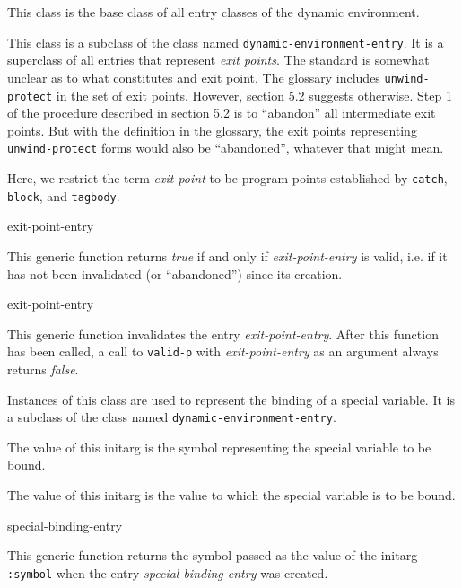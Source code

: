 
This class is the base class of all entry classes of the dynamic
environment.


This class is a subclass of the class named
\texttt{dynamic-environment-entry}.  It is a superclass of all entries
that represent \emph{exit points}.  The \commonlisp{} standard is
somewhat unclear as to what constitutes and exit point.  The glossary
includes \texttt{unwind-protect} in the set of exit points.  However,
section 5.2 suggests otherwise.  Step 1 of the procedure described in
section 5.2 is to ``abandon'' all intermediate exit points.  But with
the definition in the glossary, the exit points representing
\texttt{unwind-protect} forms would also be ``abandoned'', whatever
that might mean.

Here, we restrict the term \emph{exit point} to be program points
established by \texttt{catch}, \texttt{block}, and \texttt{tagbody}.

 {exit-point-entry}

This generic function returns \textit{true} if and only if
\textit{exit-point-entry} is valid, i.e. if it has not been invalidated (or
``abandoned'') since its creation.

 {exit-point-entry}

This generic function invalidates the entry \textit{exit-point-entry}.
After this function has been called, a call to \texttt{valid-p} with
\textit{exit-point-entry} as an argument always returns \textit{false}.


Instances of this class are used to represent the binding of a special
variable.  It is a subclass of the class named
\texttt{dynamic-environment-entry}.


The value of this initarg is the symbol representing the special
variable to be bound.


The value of this initarg is the value to which the special variable
is to be bound.

 {special-binding-entry}

This generic function returns the symbol passed as the value of the
initarg \texttt{:symbol} when the entry \textit{special-binding-entry}
was created.

